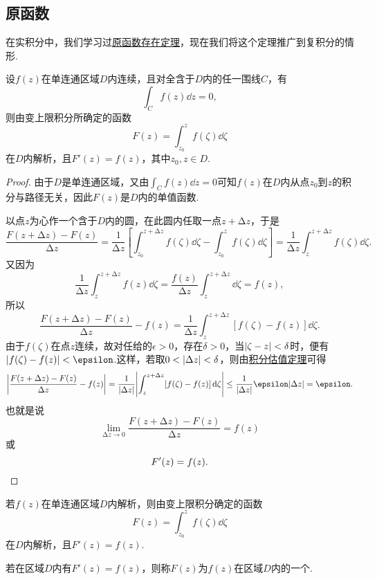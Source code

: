 \subsection{原函数}
在实积分中，我们学习过\hyperref[theorem:定积分.原函数存在定理]{原函数存在定理}，现在我们将这个定理推广到复积分的情形.
\begin{theorem}\label{theorem:解析函数的积分表示.原函数1}
设\(f(z)\)在单连通区域\(D\)内连续，且对全含于\(D\)内的任一围线\(C\)，有\[
\int_C f(z) \dd{z} = 0,
\]则由变上限积分所确定的函数\[
F(z) = \int_{z_0}^z f(\zeta) \dd{\zeta}
\]在\(D\)内解析，且\(F'(z) = f(z)\)，其中\(z_0, z \in D\).
\begin{proof}
由于\(D\)是单连通区域，又由\(\int_C f(z) \dd{z}=0\)可知\(f(z)\)在\(D\)内从点\(z_0\)到\(z\)的积分与路径无关，因此\(F(z)\)是\(D\)内的单值函数.

以点\(z\)为心作一个含于\(D\)内的圆，在此圆内任取一点\(z+\increment z\)，于是\[
\frac{F(z+\increment z)-F(z)}{\increment z}
= \frac{1}{\increment z}\left[
 \int_{z_0}^{z+\increment z} f(\zeta) \dd{\zeta}
 -\int_{z_0}^z f(\zeta) \dd{\zeta}
\right]
= \frac{1}{\increment z} \int_z^{z+\increment z} f(\zeta) \dd{\zeta}.
\]又因为\[
\frac{1}{\increment z} \int_z^{z+\increment z} f(z) \dd{\zeta}
= \frac{f(z)}{\increment z} \int_z^{z+\increment z} \dd{\zeta} = f(z),
\]所以\[
\frac{F(z+\increment z)-F(z)}{\increment z} - f(z)
= \frac{1}{\increment z} \int_z^{z+\increment z} [f(\zeta)-f(z)]\dd{\zeta}.
\]由于\(f(\zeta)\)在点\(z\)连续，故对任给的\(\epsilon > 0\)，存在\(\delta > 0\)，当\(\abs{\zeta - z} < \delta\)时，便有\(\abs{f(\zeta)-f(z)} < \epsilon\).这样，若取\(0<\abs{\Delta z}<\delta\)，则由\hyperref[theorem:解析函数的积分表示.积分估值定理]{积分估值定理}可得\[
\abs{\frac{F(z+\increment z)-F(z)}{\increment z} - f(z)}
= \frac{1}{\abs{\increment z}} \abs{ \int_z^{z+\increment z} [f(\zeta)-f(z)]\dd{\zeta} }
\leq \frac{1}{\abs{\increment z}} \epsilon \abs{\increment z}
= \epsilon.
\]也就是说\[
\lim_{\increment z\to0} \frac{F(z+\increment z)-F(z)}{\increment z} = f(z)
\]或\[
F'(z) = f(z).
\qedhere
\]
\end{proof}
\end{theorem}

\begin{corollary}\label{theorem:解析函数的积分表示.原函数2}
若\(f(z)\)在单连通区域\(D\)内解析，则由变上限积分确定的函数\[
F(z) = \int_{z_0}^z f(\zeta) \dd{\zeta}
\]在\(D\)内解析，且\(F'(z) = f(z)\).
\end{corollary}

\begin{definition}
若在区域\(D\)内有\(F'(z)=f(z)\)，则称\(F(z)\)为\(f(z)\)在区域\(D\)内的一个.
\end{definition}

